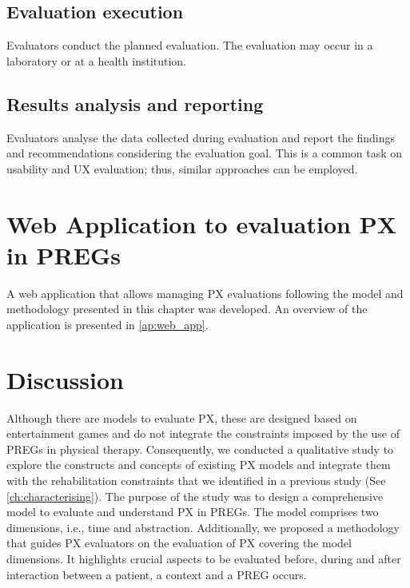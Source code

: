 \subsection{Evaluation execution}
Evaluators conduct the planned evaluation. The evaluation may occur in a laboratory or at a health institution.

\subsection{Results analysis and reporting}
Evaluators analyse the data collected during evaluation and report the findings and recommendations considering the evaluation goal. This is a common task on usability and \ac{UX} evaluation; thus, similar approaches can be employed.

\section{Web Application to evaluation PX in PREGs}
A web application that allows managing \ac{PX} evaluations following the model and methodology presented in this chapter was developed. An overview of the application is presented in \autoref{ap:web_app}.


\section{Discussion} %
\label{sec:discussion_model}
Although there are models to evaluate \ac{PX}, these are designed based on entertainment games and do not integrate the constraints imposed by the use of \acp{PREG} in physical therapy. Consequently, we conducted a qualitative study to explore the constructs and concepts of existing \ac{PX} models and integrate them with the rehabilitation constraints that we identified in a previous study (See \autoref{ch:characterising}). The purpose of the study was to design a comprehensive model to evaluate and understand \ac{PX} in \acp{PREG}. The model comprises two dimensions, i.e., time and abstraction. Additionally, we proposed a methodology that guides \ac{PX} evaluators on the evaluation of \ac{PX} covering the model dimensions. It highlights crucial aspects to be evaluated before, during and after interaction between a patient, a context and a \ac{PREG} occurs.

